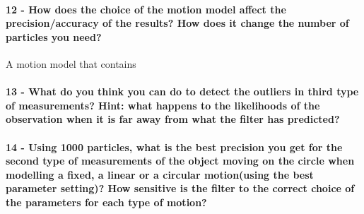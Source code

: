\documentclass[12pt]{article}
\begin{document}
\paragraph{12 - How does the choice of the motion model affect the precision/accuracy of the results? How does it change the number of particles you need?}
A motion model that contains

\paragraph{13 - What do you think you can do to detect the outliers in third type of measurements? Hint: what happens to the likelihoods of the observation when it is far away from what the filter has predicted?}

\paragraph{14 - Using 1000 particles, what is the best precision you get for the second type of measurements of the object moving on the circle when modelling a fixed, a linear or a circular motion(using the best parameter setting)? How sensitive is the filter to the correct choice of the parameters for each type of motion?}
\end{document}
